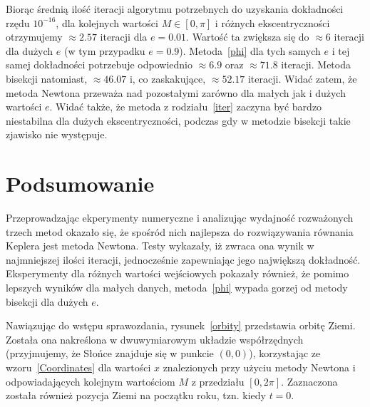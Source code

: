 \documentclass[11pt,wide,leqno]{article}
\begin{document}
        Biorąc średnią ilość iteracji algorytmu potrzebnych do uzyskania dokładności 
        rzędu \(10^{-16}\), dla kolejnych wartości \(M \in [0,\pi]\) i różnych ekscentryczności
        otrzymujemy \(\approx 2.57\) iteracji dla \(e = 0.01\). Wartość ta zwiększa się do 
        \(\approx 6\) iteracji dla dużych \(e\) (w tym przypadku \(e = 0.9\)). Metoda~\eqref{phi}
        dla tych samych \(e\) i tej samej dokładności potrzebuje odpowiednio \(\approx 6.9\) oraz \(\approx 71.8\) iteracji.
        Metoda bisekcji natomiast, \(\approx 46.07\) i, co zaskakujące, \(\approx 52.17\) iteracji. Widać zatem, że
        metoda Newtona przeważa nad pozostałymi zarówno dla małych jak i dużych wartości \(e\). Widać także, że
        metoda z rodziału~\ref{iter} zaczyna być bardzo niestabilna dla dużych ekscentryczności, podczas
        gdy w metodzie bisekcji takie zjawisko nie występuje.

    \section{Podsumowanie}
        Przeprowadzając ekperymenty numeryczne i analizując wydajność rozważonych trzech metod
        okazało się, że spośród nich najlepsza do rozwiązywania równania Keplera jest metoda Newtona.
        Testy wykazały, iż zwraca ona wynik w najmniejszej ilości iteracji, jednocześnie zapewniając jego największą dokładność.
        Eksperymenty dla różnych wartości wejściowych pokazały również, że pomimo
        lepszych wyników dla małych danych, metoda~\eqref{phi} wypada gorzej od metody bisekcji dla dużych \(e\).

        Nawiązując do wstępu sprawozdania, rysunek~\ref{orbity} przedstawia orbitę Ziemi.
        Została ona nakreślona w dwuwymiarowym układzie współrzędnych (przyjmujemy, że Słońce znajduje się w punkcie \((0,0)\)),
        korzystając ze wzoru~\eqref{Coordinates} dla wartości \(x\) znalezionych przy użyciu metody Newtona i odpowiadających kolejnym wartościom \(M\) z 
        przedziału \([0,2\pi]\). Zaznaczona została również pozycja Ziemi na początku roku, tzn. kiedy \(t = 0\).
        
        \begin{center}
        \end{center}
\end{document}
